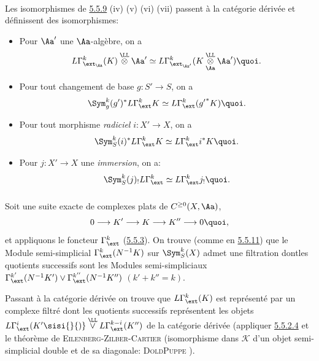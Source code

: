 \paragraph{}
Les isomorphismes de \hyperref[XVII.subsubsec5.5.9]{5.5.9} (iv) (v) (vi) (vii)
passent à la catégorie dérivée et définissent des isomorphismes:
\begin{itemize}
\item[${\rm(iv')}$] Pour $\Aa'$ une $\Aa$-algèbre, on a
$$
L\Gamma^{k}_{\ext_{\Aa}}(K)\overset{\LL}{\otimes}
\Aa'\simeq
L\Gamma^{k}_{\ext_{\Aa'}}(K\overset{\LL}{\underset{\Aa}{\otimes}}\Aa'){\quoi}.
$$

\item[${\rm(v')}$] Pour tout changement de base $g:S'\rightarrow S$,
on a
$$
\Sym^{k}_{g}(g')^{\ast}L\Gamma^{k}_{\ext}K\simeq
L\Gamma^{k}_{\ext}({g'}^{\ast}K){\quoi}.
$$

\item[${\rm (vi')}$] Pour tout morphisme \emph{radiciel}
$i:X'\rightarrow X$, on a
$$
\Sym^{k}_{S}(i)^{\ast}L\Gamma^{k}_{\ext}K\simeq
L\Gamma^{k}_{\ext}i^{\ast}K{\quoi}.
$$

\item[${\rm (vii')}$] Pour $j:X'\rightarrow X$ une \emph{immersion},
on a:
$$
\Sym^{k}_{S}(j)_{!} L\Gamma^{k}_{\ext}\simeq
L\Gamma^{k}_{\ext}j_{!}{\quoi}.
$$
\end{itemize}

\subsubsection{}
Soit une suite exacte de complexes plats de $C^{\geq
0}(X,\Aa)$,
$$
0\longrightarrow K'\longrightarrow K\longrightarrow K''\longrightarrow
0{\quoi},
$$
et appliquons le foncteur $\Gamma^{k}_{\ext}$
(\hyperref[XVII.subsubsec5.5.3]{5.5.3}). On trouve
(comme en \hyperref[XVII.subsubsec5.5.11]{5.5.11}) que le Module semi-simplicial
$\Gamma^{k}_{\ext}(N^{-1}K)$ sur $\Sym^{k}_{S}(X)$ admet une
filtration dont\pageoriginale les quotients successifs sont les
Modules semi-simpliciaux $\Gamma^{k'}_{\ext}(N^{-1}K')\vee
\Gamma^{k''}_{\ext}(N^{-1}K'')$ $(k'+k''=k)$.

Passant à la catégorie dérivée on trouve que $L\Gamma^{k}_{\ext}(K)$
est représenté par un complexe filtré dont les quotients successifs
représentent les objets
$L\Gamma^{i}_{\ext}(K'\sisi{}{)}\overset{\LL}{\vee}L\Gamma^{k-i}_{\ext}
(K'')$ de la catégorie dérivée (appliquer \hyperref[XVII.par5.5.2.4]{5.5.2.4} et le
théorème de
\textsc{Eilenberg-Zilber-Cartier} (isomorphisme dans $\mathcal{K}$ d'un objet
semi-simplicial double et de sa diagonale: \textsc{Dold\sisi{ }{-}Puppe} \cite[2.9 ]{DP}).

